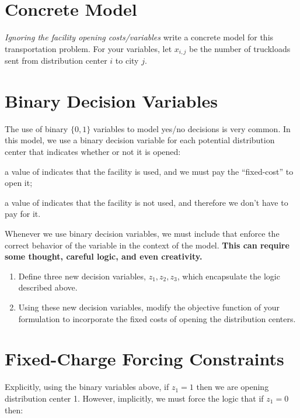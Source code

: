 \documentclass[11pt]{article}
\theoremstyle{definition}
\newcommand{\answerbox}[3]{%
  \fbox{%
    \begin{minipage}[#1]{#2}
      \hfill\vspace{#3}
    \end{minipage}
  }
}
\newcommand{\wordbox}{\answerbox{c}{1.2in}{.5cm}}
\newcommand{\letterbox}{\answerbox{c}{.7cm}{.5cm}}
\begin{document}
\newpage

\section{Concrete Model}

\emph{Ignoring the facility opening costs/variables} write a concrete model for this transportation problem. For your variables, let $x_{i,j}$ be the number of truckloads sent from distribution center $i$ to city $j$. 

\newpage


\section{Binary Decision Variables}

The use of binary $\{0,1\}$ variables to model yes/no decisions is very common.  In this model, we use a binary decision variable for each potential distribution center that indicates whether or not it is opened:

a value of \letterbox indicates that the facility is used, and we must pay the ``fixed-cost'' to open it;

a value of \letterbox indicates that the facility is not used, and therefore we don't have to pay for it.



Whenever we use binary decision variables, we must include \wordbox that enforce the correct behavior of the variable in the context of the model.  \textbf{This can require some thought, careful logic, and even creativity.}  

\begin{enumerate}
\item Define three new decision variables, $z_1, z_2, z_3$, which encapsulate the logic described above. \vspace{2in}
\item Using these new decision variables, modify the objective function of your formulation to incorporate the fixed costs of opening the distribution centers.
\end{enumerate}

\newpage


\section{Fixed-Charge Forcing Constraints}

Explicitly, using the binary variables above, if $z_1 = 1$ then we are opening distribution center 1. However, implicitly, we must force the logic that if $z_1 = 0$ then: \vspace{1cm}
\end{document}
